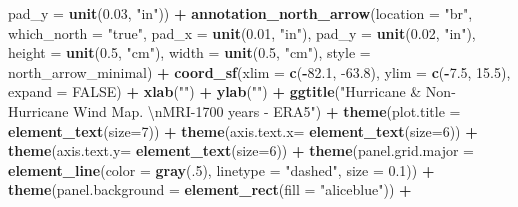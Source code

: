 \documentclass[12pt,twoside]{reedthesis}
\newenvironment{Shaded}{\begin{snugshade}}{\end{snugshade}}
\newcommand{\CharTok}[1]{\textcolor[rgb]{0.31,0.60,0.02}{#1}}
\newcommand{\DataTypeTok}[1]{\textcolor[rgb]{0.13,0.29,0.53}{#1}}
\newcommand{\DecValTok}[1]{\textcolor[rgb]{0.00,0.00,0.81}{#1}}
\newcommand{\FloatTok}[1]{\textcolor[rgb]{0.00,0.00,0.81}{#1}}
\newcommand{\KeywordTok}[1]{\textcolor[rgb]{0.13,0.29,0.53}{\textbf{#1}}}
\newcommand{\NormalTok}[1]{#1}
\newcommand{\OperatorTok}[1]{\textcolor[rgb]{0.81,0.36,0.00}{\textbf{#1}}}
\newcommand{\OtherTok}[1]{\textcolor[rgb]{0.56,0.35,0.01}{#1}}
\newcommand{\StringTok}[1]{\textcolor[rgb]{0.31,0.60,0.02}{#1}}
\begin{document}
\begin{Shaded}
\begin{Highlighting}[]
   \DataTypeTok{pad_y =} \KeywordTok{unit}\NormalTok{(}\FloatTok{0.03}\NormalTok{, }\StringTok{"in"}\NormalTok{)) }\OperatorTok{+}\StringTok{ }
\StringTok{  }\KeywordTok{annotation_north_arrow}\NormalTok{(}\DataTypeTok{location =} \StringTok{"br"}\NormalTok{, }\DataTypeTok{which_north =} \StringTok{"true"}\NormalTok{, }\DataTypeTok{pad_x =} \KeywordTok{unit}\NormalTok{(}\FloatTok{0.01}\NormalTok{, }\StringTok{"in"}\NormalTok{), }\DataTypeTok{pad_y =} \KeywordTok{unit}\NormalTok{(}\FloatTok{0.02}\NormalTok{, }\StringTok{"in"}\NormalTok{), }\DataTypeTok{height =} \KeywordTok{unit}\NormalTok{(}\FloatTok{0.5}\NormalTok{, }\StringTok{"cm"}\NormalTok{), }
   \DataTypeTok{width =} \KeywordTok{unit}\NormalTok{(}\FloatTok{0.5}\NormalTok{, }\StringTok{"cm"}\NormalTok{), }\DataTypeTok{style =}\NormalTok{ north_arrow_minimal) }\OperatorTok{+}
\StringTok{  }\KeywordTok{coord_sf}\NormalTok{(}\DataTypeTok{xlim =} \KeywordTok{c}\NormalTok{(}\OperatorTok{-}\FloatTok{82.1}\NormalTok{, }\FloatTok{-63.8}\NormalTok{), }\DataTypeTok{ylim =} \KeywordTok{c}\NormalTok{(}\OperatorTok{-}\FloatTok{7.5}\NormalTok{, }\FloatTok{15.5}\NormalTok{), }\DataTypeTok{expand =} \OtherTok{FALSE}\NormalTok{) }\OperatorTok{+}
\StringTok{  }\KeywordTok{xlab}\NormalTok{(}\StringTok{""}\NormalTok{) }\OperatorTok{+}\StringTok{ }
\StringTok{  }\KeywordTok{ylab}\NormalTok{(}\StringTok{""}\NormalTok{) }\OperatorTok{+}\StringTok{ }
\StringTok{  }\KeywordTok{ggtitle}\NormalTok{(}\StringTok{"Hurricane & Non-Hurricane Wind Map. }\CharTok{\textbackslash{}n}\StringTok{MRI-1700 years - ERA5"}\NormalTok{) }\OperatorTok{+}\StringTok{ }
\StringTok{  }\KeywordTok{theme}\NormalTok{(}\DataTypeTok{plot.title =} \KeywordTok{element_text}\NormalTok{(}\DataTypeTok{size=}\DecValTok{7}\NormalTok{)) }\OperatorTok{+}
\StringTok{  }\KeywordTok{theme}\NormalTok{(}\DataTypeTok{axis.text.x=} \KeywordTok{element_text}\NormalTok{(}\DataTypeTok{size=}\DecValTok{6}\NormalTok{)) }\OperatorTok{+}\StringTok{ }
\StringTok{  }\KeywordTok{theme}\NormalTok{(}\DataTypeTok{axis.text.y=} \KeywordTok{element_text}\NormalTok{(}\DataTypeTok{size=}\DecValTok{6}\NormalTok{)) }\OperatorTok{+}
\StringTok{  }\KeywordTok{theme}\NormalTok{(}\DataTypeTok{panel.grid.major =} \KeywordTok{element_line}\NormalTok{(}\DataTypeTok{color =} \KeywordTok{gray}\NormalTok{(.}\DecValTok{5}\NormalTok{), }\DataTypeTok{linetype =} \StringTok{"dashed"}\NormalTok{, }\DataTypeTok{size =} \FloatTok{0.1}\NormalTok{)) }\OperatorTok{+}
\StringTok{  }\KeywordTok{theme}\NormalTok{(}\DataTypeTok{panel.background =} \KeywordTok{element_rect}\NormalTok{(}\DataTypeTok{fill =} \StringTok{"aliceblue"}\NormalTok{)) }\OperatorTok{+}

\end{Highlighting}
\end{Shaded}
\end{document}
